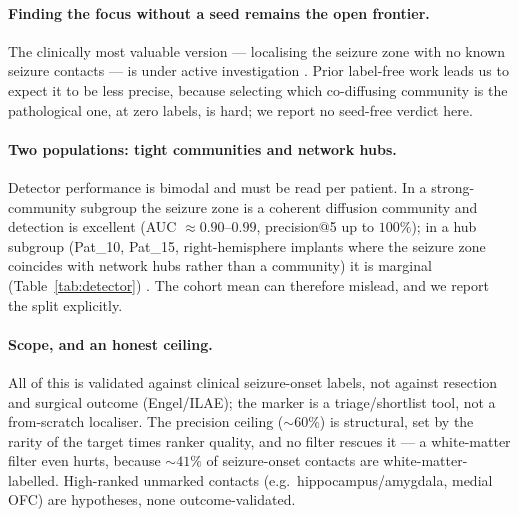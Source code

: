 \documentclass[11pt]{article}
\newcommand{\tab}[1]{Table~\ref{#1}}
\begin{document}
\paragraph{Finding the focus without a seed remains the open frontier.}
The clinically most valuable version --- localising the seizure zone with no
known seizure contacts --- is under active investigation
. Prior label-free work leads us to expect it to be less precise, because
selecting which co-diffusing community is the pathological one, at zero labels,
is hard; we report no seed-free verdict here.

\paragraph{Two populations: tight communities and network hubs.}
Detector performance is bimodal and must be read per patient. In a
strong-community subgroup the seizure zone is a coherent diffusion community and
detection is excellent (AUC $\approx0.90$--$0.99$, precision@5 up to $100\%$); in
a hub subgroup (Pat\_10, Pat\_15, right-hemisphere implants where the seizure
zone coincides with network hubs rather than a community) it is marginal
(\tab{tab:detector})
. The cohort mean can therefore mislead, and we report the split explicitly.

\paragraph{Scope, and an honest ceiling.}
All of this is validated against clinical seizure-onset labels, not against
resection and surgical outcome (Engel/ILAE); the marker is a triage/shortlist
tool, not a from-scratch localiser. The precision ceiling ($\sim60\%$) is
structural, set by the rarity of the target times ranker quality, and no filter
rescues it --- a white-matter filter even hurts, because $\sim41\%$ of
seizure-onset contacts are white-matter-labelled. High-ranked unmarked contacts
(e.g.\ hippocampus/amygdala, medial OFC) are hypotheses, none outcome-validated.
\end{document}
